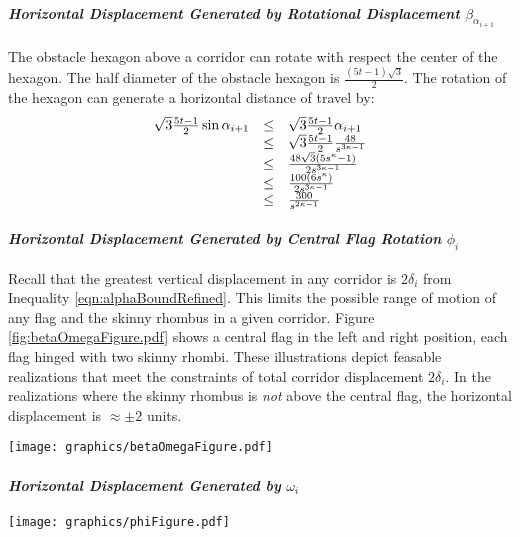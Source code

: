\paragraph{\textit{Horizontal Displacement Generated by Rotational Displacement} $\beta_{\alpha_{i+1}}$}
The obstacle hexagon above a corridor can rotate with respect the center of the hexagon.  
The half diameter of the obstacle hexagon is $ \frac{(5t-1)\sqrt{3}}{2}$.  
The rotation of the hexagon can generate a horizontal distance of travel by:
\begin{equation}
\begin{array}{rcl}
\sqrt{3} \frac{5t-1}{2} \sin \alpha_{i+1} &\leq&\sqrt{3} \frac{5t-1}{2}  \alpha_{i+1} \\
&\leq& \sqrt{3} \frac{5t-1}{2}  \frac{48}{s^{3\kappa-1}}\\
&\leq& \frac{48 \sqrt{3} \left( 5s^\kappa - 1 \right)}{2s^{3\kappa-1}}\\
&\leq& \frac{100 \left( 6s^\kappa \right)}{2s^{3\kappa-1}}\\
&\leq& \frac{300}{s^{2\kappa-1}}\\
\end{array}
\end{equation}

\paragraph{\textit{Horizontal Displacement Generated by Central Flag Rotation} $\phi_i$}
Recall that the greatest vertical displacement in any corridor is $2\delta_i$ from Inequality \ref{eqn:alphaBoundRefined}.  
This limits the possible range of motion of any flag and the skinny rhombus in a given corridor.  
Figure \ref{fig:betaOmegaFigure.pdf} shows a central flag in the left and right position, each flag hinged with two skinny rhombi.
These illustrations depict feasable realizations that meet the constraints of total corridor displacement $2 \delta_i$.  
In the realizations where the skinny rhombus is \textit{not} above the central flag, the horizontal displacement is $\approx \pm 2$ units. 

\begin{minipage}{\linewidth}
\begin{center}
\texttt{[image: graphics/betaOmegaFigure.pdf]}
\label{fig:betaOmegaFigure.pdf}
\end{center}
\end{minipage}

\paragraph{\textit{Horizontal Displacement Generated by} $\omega_i$}

\begin{minipage}{\linewidth}
\begin{center}
\texttt{[image: graphics/phiFigure.pdf]}
\label{fig:phiFigure.pdf}
\end{center}
\end{minipage}


